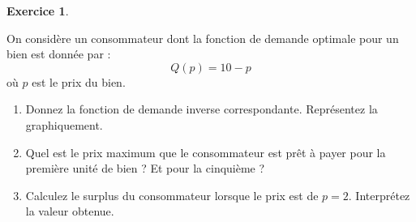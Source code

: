 \documentclass[
]{book}
\providecommand{\tightlist}{%
  \setlength{\itemsep}{0pt}\setlength{\parskip}{0pt}}
\theoremstyle{definition}
\theoremstyle{definition}
\theoremstyle{definition}
\newtheorem{exercise}{Exercice}[chapter]
\theoremstyle{definition}
\theoremstyle{remark}
\begin{document}
\begin{exercise}
\protect\hypertarget{exr:cppexo1}{}\label{exr:cppexo1}

On considère un consommateur dont la fonction de demande optimale pour un bien est donnée par :
\[
Q(p)=10-p
\]
où \(p\) est le prix du bien.

\begin{enumerate}
\def\labelenumi{\arabic{enumi}.}
\tightlist
\item
  Donnez la fonction de demande inverse correspondante. Représentez la graphiquement.
\item
  Quel est le prix maximum que le consommateur est prêt à payer pour la première unité de bien ? Et pour la cinquième ?
\item
  Calculez le surplus du consommateur lorsque le prix est de \(p=2\). Interprétez la valeur obtenue.
\end{enumerate}

\end{exercise}
\end{document}
